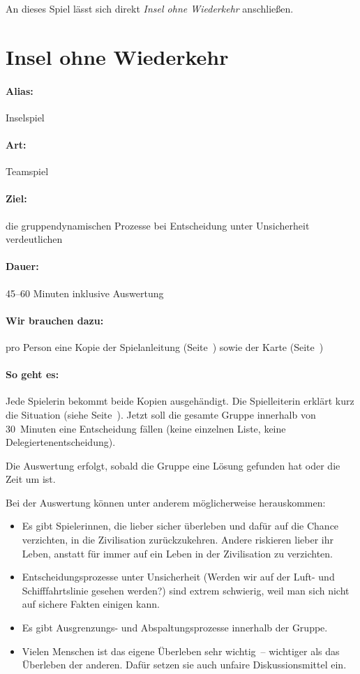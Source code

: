 An dieses Spiel lässt sich direkt \emph{Insel ohne Wiederkehr} anschließen.

\section{Insel ohne Wiederkehr}
\paragraph{Alias:} Inselspiel
\paragraph{Art:} Teamspiel
\paragraph{Ziel:} die gruppendynamischen Prozesse bei Entscheidung unter Unsicherheit verdeutlichen
\paragraph{Dauer:} 45--60 Minuten inklusive Auswertung
\paragraph{Wir brauchen dazu:} pro Person eine Kopie der Spielanleitung (Seite~\pageref{wiederkehr-kopien}) sowie der Karte (Seite~\pageref{wiederkehr-karte})
\paragraph{So geht es:} Jede Spielerin bekommt beide Kopien ausgehändigt. Die Spielleiterin erklärt kurz die Situation (siehe Seite~\pageref{wiederkehr-kopien}). Jetzt soll die gesamte Gruppe innerhalb von 30~Minuten eine Entscheidung fällen (keine einzelnen Liste, keine Delegiertenentscheidung).

Die Auswertung erfolgt, sobald die Gruppe eine Lösung gefunden hat oder die Zeit um ist.

Bei der Auswertung können unter anderem möglicherweise herauskommen:
\begin{itemize}
  \item Es gibt Spielerinnen, die lieber sicher überleben und dafür auf die Chance verzichten, in die Zivilisation zurückzukehren. Andere riskieren lieber ihr Leben, anstatt für immer auf ein Leben in der Zivilisation zu verzichten.
  \item Entscheidungsprozesse unter Unsicherheit (Werden wir auf der Luft- und Schifffahrtslinie gesehen werden?) sind extrem schwierig, weil man sich nicht auf sichere Fakten einigen kann.
  \item Es gibt Ausgrenzungs- und Abspaltungsprozesse innerhalb der Gruppe.
  \item Vielen Menschen ist das eigene Überleben sehr wichtig~-- wichtiger als das Überleben der anderen. Dafür setzen sie auch unfaire Diskussionsmittel ein.
\end{itemize}

